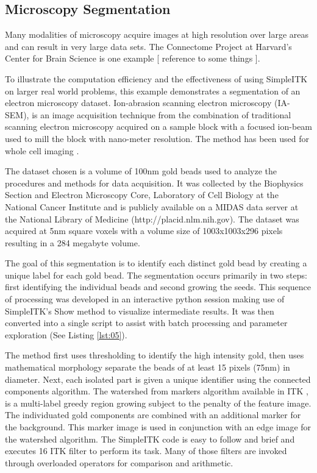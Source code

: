 \documentclass{frontiersMED} %
\begin{document}
\subsection{Microscopy Segmentation}
Many modalities of microscopy acquire images at high resolution over
large areas and can result in very large data sets. The Connectome Project at
Harvard’s Center for Brain Science is one example [ reference to some
  things ]. 
  
To illustrate the computation efficiency and the effectiveness of 
using SimpleITK on larger real world problems, this example
demonstrates a segmentation of an electron microscopy
dataset. Ion-abrasion scanning electron microscopy (IA-SEM), is an
image acquisition technique from the combination of traditional
scanning electron microscopy acquired on a sample block with a focused
ion-beam used to mill the block with nano-meter resolution. The method
has been used for whole cell imaging \cite{Murphy2011}. 

The dataset chosen is a volume of 100nm gold beads used to analyze the
procedures and methods for data acquisition. It was collected by the
Biophysics Section and Electron Microscopy Core, Laboratory of Cell
Biology at the National Cancer Institute and is publicly available on
a MIDAS data server at the National Library of Medicine
(http://placid.nlm.nih.gov). The dataset was acquired at 5nm square
voxels with a volume size of 1003x1003x296 pixels resulting in a 284
megabyte volume. 
	
The goal of this segmentation is to identify each distinct gold bead
by creating a unique label for each gold bead. The segmentation occurs
primarily in two steps: first identifying the individual beads and 
second growing the seeds. This sequence of
processing was developed in an interactive python session making use
of SimpleITK’s Show method to visualize intermediate results. It was
then converted into a single script to assist with batch processing
and parameter exploration (See Listing \ref{lst:05}).



The method first uses thresholding to identify the high intensity gold, 
then uses mathematical morphology separate the beads of at least 15 pixels
(75nm) in diameter. Next, each isolated part is given a unique
identifier using the connected components algorithm. The watershed from
markers algorithm available in ITK \cite{Beare2006}, is
a multi-label greedy region growing subject to the penalty of the
feature image. The individuated gold components are combined with an
additional marker for the background. This marker image is used in
conjunction with an edge image for the watershed algorithm. The
SimpleITK code is easy to follow and brief and executes 16 ITK filter
to perform its task. Many of those filters are invoked through
overloaded operators for comparison and arithmetic. 
\end{document}

